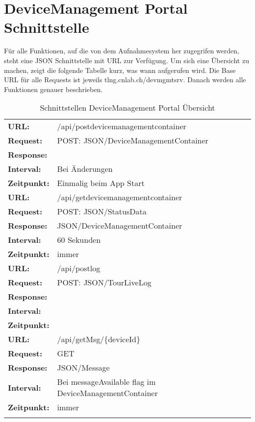 \section{DeviceManagement Portal Schnittstelle}

Für alle Funktionen, auf die von dem Aufnahmesystem her zugegrifen werden, steht eine JSON Schnittstelle mit URL zur Verfügung. Um sich eine Übersicht zu machen, zeigt die folgende Tabelle kurz, was wann aufgerufen wird. Die Base URL für alle Requests ist jeweils tlng.cnlab.ch/devmgmtsrv. Danach werden alle Funktionen genauer beschrieben.

{\renewcommand{\arraystretch}{1.5}%
    \begin{longtable}{ p{2.5cm}  p{10cm}}
	\textbf{URL:} & /api/postdevicemanagementcontainer \\
	\textbf{Request:} & POST: JSON/DeviceManagementContainer \\
	\textbf{Response:} &  \\
	\textbf{Interval:} & Bei Änderungen \\
	\textbf{Zeitpunkt:} & Einmalig beim App Start \\ 
\hline
\hline    
	\textbf{URL:} & /api/getdevicemanagementcontainer \\
	\textbf{Request:} & POST: JSON/StatusData \\
	\textbf{Response:} & JSON/DeviceManagementContainer \\
	\textbf{Interval:} & 60 Sekunden \\
	\textbf{Zeitpunkt:} & immer \\ 
\hline
\hline    
	\textbf{URL:} & /api/postlog \\
	\textbf{Request:} & POST: JSON/TourLiveLog \\
	\textbf{Response:} &  \\
	\textbf{Interval:} &  \\
	\textbf{Zeitpunkt:} &  \\ 
\hline
\hline 
	\textbf{URL:} & /api/getMsg/\{deviceId\} \\
	\textbf{Request:} & GET \\
	\textbf{Response:} &  JSON/Message\\
	\textbf{Interval:} &  Bei messageAvailable flag im DeviceManagementContainer\\
	\textbf{Zeitpunkt:} &  immer\\ 
\hline
\hline 

\caption{Schnittstellen DeviceManagement Portal Übersicht}
\end{longtable} }

